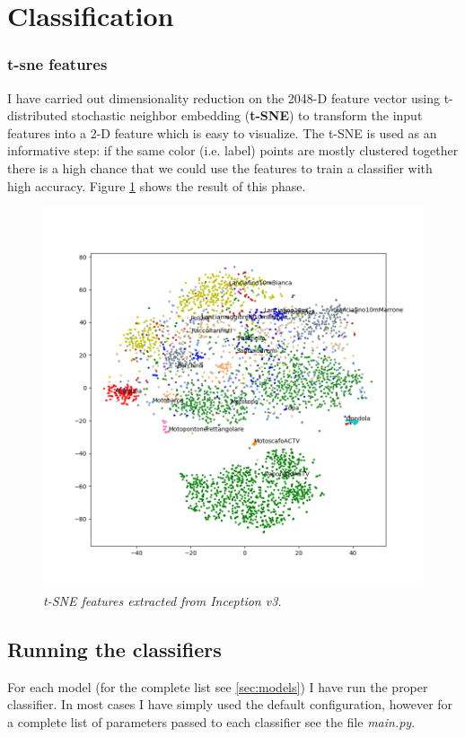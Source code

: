 \documentclass[12pt]{article}
\begin{document}
\section{Classification}
\subsubsection{t-sne features}
I have carried out dimensionality reduction on the 2048-D feature vector using t-distributed stochastic neighbor embedding (\textbf{t-SNE}) to transform the input features into a 2-D feature which is easy to visualize. The t-SNE is used as an informative step: if the same color (i.e. label) points are mostly clustered together there is a high chance that we could use the features to train a classifier with high accuracy. Figure \ref{fig:tsne} shows the result of this phase.

\begin{figure}[!ht]
	\centering %
	\includegraphics[width=1\textwidth]{../code/output/features.png} %
	\caption{\textit{t-SNE features extracted from Inception v3.}} %
	\label{fig:tsne}
\end{figure}

\subsection{Running the classifiers}
For each model (for the complete list see \ref{sec:models}) I have run the proper classifier. In most cases I have simply used the default configuration, however for a complete list of parameters passed to each classifier see the file \textit{main.py}.
\end{document}
